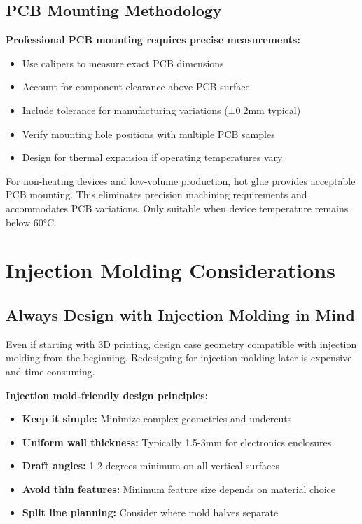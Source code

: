 \subsection{PCB Mounting Methodology}

\textbf{Professional PCB mounting requires precise measurements:}
\begin{itemize}
\item Use calipers to measure exact PCB dimensions
\item Account for component clearance above PCB surface
\item Include tolerance for manufacturing variations (±0.2mm typical)
\item Verify mounting hole positions with multiple PCB samples
\item Design for thermal expansion if operating temperatures vary
\end{itemize}

\begin{tcolorbox}[colback=blue!10,colframe=blue!75!black,title=Alternative: Hot Glue Mounting]
For non-heating devices and low-volume production, hot glue provides acceptable PCB mounting. This eliminates precision machining requirements and accommodates PCB variations. Only suitable when device temperature remains below 60°C.
\end{tcolorbox}

\section{Injection Molding Considerations}

\subsection{Always Design with Injection Molding in Mind}

Even if starting with 3D printing, design case geometry compatible with injection molding from the beginning. Redesigning for injection molding later is expensive and time-consuming.

\textbf{Injection mold-friendly design principles:}
\begin{itemize}
\item \textbf{Keep it simple:} Minimize complex geometries and undercuts
\item \textbf{Uniform wall thickness:} Typically 1.5-3mm for electronics enclosures
\item \textbf{Draft angles:} 1-2 degrees minimum on all vertical surfaces
\item \textbf{Avoid thin features:} Minimum feature size depends on material choice
\item \textbf{Split line planning:} Consider where mold halves separate
\end{itemize}

